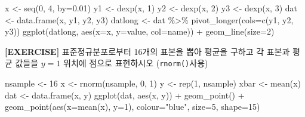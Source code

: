 \documentclass[
]{book}
\newenvironment{Shaded}{\begin{snugshade}}{\end{snugshade}}
\newcommand{\AttributeTok}[1]{\textcolor[rgb]{0.77,0.63,0.00}{#1}}
\newcommand{\DecValTok}[1]{\textcolor[rgb]{0.00,0.00,0.81}{#1}}
\newcommand{\FloatTok}[1]{\textcolor[rgb]{0.00,0.00,0.81}{#1}}
\newcommand{\FunctionTok}[1]{\textcolor[rgb]{0.00,0.00,0.00}{#1}}
\newcommand{\NormalTok}[1]{#1}
\newcommand{\OtherTok}[1]{\textcolor[rgb]{0.56,0.35,0.01}{#1}}
\newcommand{\SpecialCharTok}[1]{\textcolor[rgb]{0.00,0.00,0.00}{#1}}
\newcommand{\StringTok}[1]{\textcolor[rgb]{0.31,0.60,0.02}{#1}}
\begin{document}
\begin{Shaded}
\begin{Highlighting}[]
\NormalTok{x }\OtherTok{\textless{}{-}} \FunctionTok{seq}\NormalTok{(}\DecValTok{0}\NormalTok{, }\DecValTok{4}\NormalTok{, }\AttributeTok{by=}\FloatTok{0.01}\NormalTok{)}
\NormalTok{y1 }\OtherTok{\textless{}{-}} \FunctionTok{dexp}\NormalTok{(x, }\DecValTok{1}\NormalTok{)}
\NormalTok{y2 }\OtherTok{\textless{}{-}} \FunctionTok{dexp}\NormalTok{(x, }\DecValTok{2}\NormalTok{)}
\NormalTok{y3 }\OtherTok{\textless{}{-}} \FunctionTok{dexp}\NormalTok{(x, }\DecValTok{3}\NormalTok{)}
\NormalTok{dat }\OtherTok{\textless{}{-}} \FunctionTok{data.frame}\NormalTok{(x, y1, y2, y3)}
\NormalTok{datlong }\OtherTok{\textless{}{-}}\NormalTok{ dat }\SpecialCharTok{\%\textgreater{}\%} \FunctionTok{pivot\_longer}\NormalTok{(}\AttributeTok{cols=}\FunctionTok{c}\NormalTok{(y1, y2, y3))}
\FunctionTok{ggplot}\NormalTok{(datlong, }\FunctionTok{aes}\NormalTok{(}\AttributeTok{x=}\NormalTok{x, }\AttributeTok{y=}\NormalTok{value, }\AttributeTok{col=}\NormalTok{name)) }\SpecialCharTok{+}
  \FunctionTok{geom\_line}\NormalTok{(}\AttributeTok{size=}\DecValTok{2}\NormalTok{)}
\end{Highlighting}
\end{Shaded}

\textbf{{[}EXERCISE{]}} 표준정규분포로부터 16개의 표본을 뽑아 평균을 구하고 각 표본과 평균 값들을 \(y=1\) 위치에 점으로 표현하시오 (\texttt{rnorm()}사용)

\begin{Shaded}
\begin{Highlighting}[]
\NormalTok{nsample }\OtherTok{\textless{}{-}} \DecValTok{16}
\NormalTok{x }\OtherTok{\textless{}{-}} \FunctionTok{rnorm}\NormalTok{(nsample, }\DecValTok{0}\NormalTok{, }\DecValTok{1}\NormalTok{)}
\NormalTok{y }\OtherTok{\textless{}{-}} \FunctionTok{rep}\NormalTok{(}\DecValTok{1}\NormalTok{, nsample)}
\NormalTok{xbar }\OtherTok{\textless{}{-}} \FunctionTok{mean}\NormalTok{(x)}
\NormalTok{dat }\OtherTok{\textless{}{-}} \FunctionTok{data.frame}\NormalTok{(x, y)}
\FunctionTok{ggplot}\NormalTok{(dat, }\FunctionTok{aes}\NormalTok{(x, y)) }\SpecialCharTok{+}
  \FunctionTok{geom\_point}\NormalTok{() }\SpecialCharTok{+}
  \FunctionTok{geom\_point}\NormalTok{(}\FunctionTok{aes}\NormalTok{(}\AttributeTok{x=}\FunctionTok{mean}\NormalTok{(x), }\AttributeTok{y=}\DecValTok{1}\NormalTok{), }\AttributeTok{colour=}\StringTok{"blue"}\NormalTok{, }\AttributeTok{size=}\DecValTok{5}\NormalTok{, }\AttributeTok{shape=}\DecValTok{15}\NormalTok{)}
\end{Highlighting}
\end{Shaded}
\end{document}
